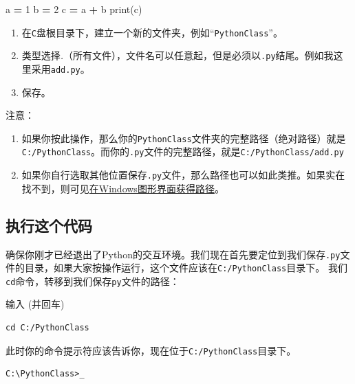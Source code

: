 \documentclass[
]{book}
\newenvironment{Shaded}{\begin{snugshade}}{\end{snugshade}}
\newcommand{\BuiltInTok}[1]{#1}
\newcommand{\DecValTok}[1]{\textcolor[rgb]{0.00,0.00,0.81}{#1}}
\newcommand{\NormalTok}[1]{#1}
\newcommand{\OperatorTok}[1]{\textcolor[rgb]{0.81,0.36,0.00}{\textbf{#1}}}
\providecommand{\tightlist}{%
  \setlength{\itemsep}{0pt}\setlength{\parskip}{0pt}}
\begin{document}
\begin{Shaded}
\begin{Highlighting}[]
\NormalTok{a }\OperatorTok{=} \DecValTok{1}
\NormalTok{b }\OperatorTok{=} \DecValTok{2}
\NormalTok{c }\OperatorTok{=}\NormalTok{ a }\OperatorTok{+}\NormalTok{ b}
\BuiltInTok{print}\NormalTok{(c)}
\end{Highlighting}
\end{Shaded}

\begin{enumerate}
\def\labelenumi{\arabic{enumi}.}
\tightlist
\item
  在\texttt{C}盘根目录下，建立一个新的文件夹，例如``\texttt{PythonClass}''。
\item
  类型选择\emph{.}（所有文件），文件名可以任意起，但是必须以\texttt{.py}结尾。例如我这里采用\texttt{add.py}。
\item
  保存。
\end{enumerate}

注意：

\begin{enumerate}
\def\labelenumi{\arabic{enumi}.}
\tightlist
\item
  如果你按此操作，那么你的\texttt{PythonClass}文件夹的完整路径（绝对路径）就是\texttt{C:/PythonClass}。而你的\texttt{.py}文件的完整路径，就是\texttt{C:/PythonClass/add.py}
\item
  如果你自行选取其他位置保存\texttt{.py}文件，那么路径也可以如此类推。如果实在找不到，则可见\protect\hyperlink{use_win}{在Windows图形界面获得路径}。
\end{enumerate}

\hypertarget{ux6267ux884cux8fd9ux4e2aux4ee3ux7801}{%
\subsection{执行这个代码}\label{ux6267ux884cux8fd9ux4e2aux4ee3ux7801}}

确保你刚才已经退出了Python的交互环境。我们现在首先要定位到我们保存\texttt{.py}文件的目录，如果大家按操作运行，这个文件应该在\texttt{C:/PythonClass}目录下。
我们\texttt{cd}命令，转移到我们保存\texttt{py}文件的路径：

输入 (并回车)

\begin{verbatim}
cd C:/PythonClass
\end{verbatim}

此时你的命令提示符应该告诉你，现在位于\texttt{C:/PythonClass}目录下。

\begin{verbatim}
C:\PythonClass>_
\end{verbatim}
\end{document}

